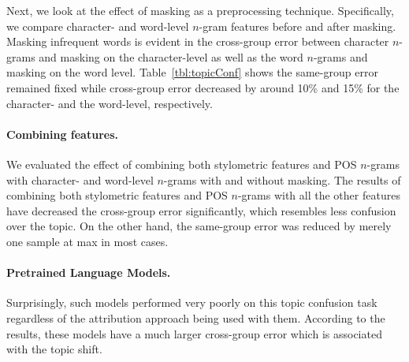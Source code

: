 \documentclass[11pt]{article}
\begin{document}
Next, we look at the effect of masking as a preprocessing technique. Specifically, we compare character- and word-level $n$-gram features before and after masking. Masking infrequent words is evident in the cross-group error between character $n$-grams and masking on the character-level as well as the word $n$-grams and masking on the word level. Table~\ref{tbl:topicConf} shows the same-group error remained fixed while cross-group error decreased by around 10\% and 15\% for the character- and the word-level, respectively. 


\paragraph{Combining features.}
We evaluated the effect of combining both stylometric features and POS $n$-grams with character- and word-level $n$-grams with and without masking. The results of combining both stylometric features and POS $n$-grams with all the other features have decreased the cross-group error significantly, which resembles less confusion over the topic. On the other hand, the same-group error was reduced by merely one sample at max in most cases. 


\paragraph{Pretrained Language Models.} Surprisingly, such models performed very poorly on this topic confusion task regardless of the attribution approach being used with them. According to the results, these models have a much larger cross-group error which is associated with the topic shift. 
\end{document}
